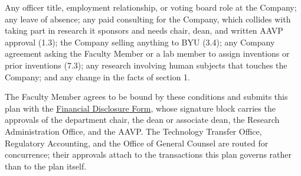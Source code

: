 \documentclass[11pt]{article}
\begin{document}

Any officer title, employment relationship, or voting board role at the
Company; any leave of absence; any paid consulting for the Company, which
collides with taking part in research it sponsors and needs chair, dean, and
written AAVP approval (1.3); the Company selling anything to BYU (3.4); any Company agreement
asking the Faculty Member or a lab member to assign inventions or prior
inventions (7.3); any research involving human subjects that touches the
Company; and any change in the facts of section 1.

{\small The Faculty Member agrees to be bound by these conditions and submits
this plan with the \href{https://spo.byu.edu/policies}{Financial Disclosure
Form}, whose signature block carries the approvals of the department chair, the
dean or associate dean, the Research Administration Office, and the AAVP. The
Technology Transfer Office, Regulatory Accounting, and the Office of General
Counsel are routed for concurrence; their approvals attach to the transactions
this plan governs rather than to the plan itself.}
\end{document}
